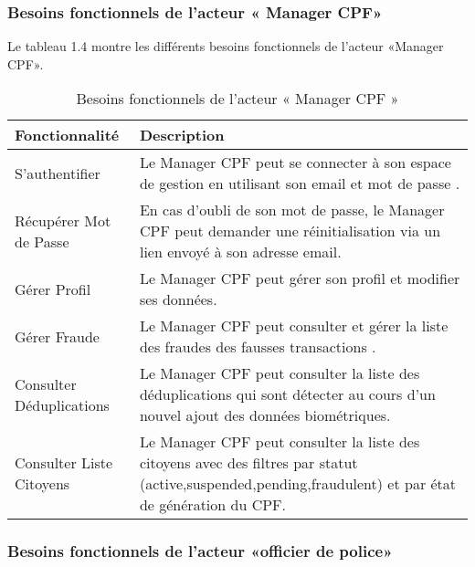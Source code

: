 \subsubsection{Besoins fonctionnels de l'acteur « Manager CPF»}

Le tableau 1.4 montre les différents besoins fonctionnels de l'acteur «Manager CPF».
\begin{longtable}
{| >{\centering\arraybackslash}p{4.2cm} | >{\arraybackslash}p{12.5cm} |}
\caption{\centering Besoins fonctionnels de l'acteur « Manager CPF »} \label{tab:besoins-citoyens} \\
\hline
\rowcolor{gray!30} \textbf{Fonctionnalité} & \textbf{Description} \\
\hline
\endfirsthead
\endhead

\hline
\endfoot

\hline
\endlastfoot

S'authentifier & Le Manager CPF peut se connecter à son espace de gestion en utilisant son email et mot de passe . \\
\hline
Récupérer Mot de Passe & En cas d'oubli de son mot de passe, le Manager CPF peut demander une réinitialisation via un lien envoyé à son adresse email. \\
\hline
Gérer Profil & Le Manager CPF peut gérer son profil et modifier ses données. \\
\hline
Gérer Fraude & Le Manager CPF peut consulter et gérer la liste des fraudes des fausses transactions . \\
\hline
Consulter Déduplications & Le Manager CPF peut consulter la liste des déduplications qui sont détecter au cours d'un nouvel ajout des données biométriques. \\
\hline
Consulter Liste Citoyens & Le Manager CPF peut consulter la liste des citoyens avec des filtres par statut (active,suspended,pending,fraudulent) et par état de génération du CPF. \\
\hline

\end{longtable}



\subsubsection{Besoins fonctionnels de l'acteur «officier de police»}


